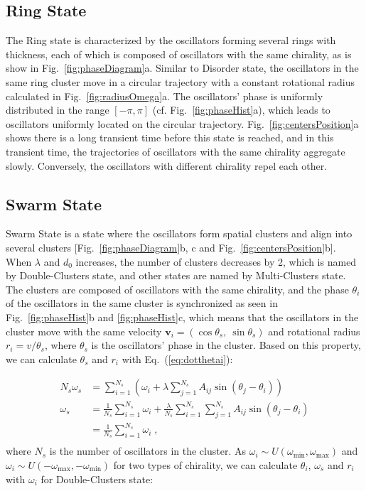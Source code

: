 \documentclass[%
 aip,
 amsmath,amssymb,
 reprint,%
]{revtex4-1}
\begin{document}
\subsection{Ring State}

The Ring state is characterized by the oscillators forming several rings with thickness, each of which is composed of oscillators with the same chirality, as is show in Fig.~\ref{fig:phaseDiagram}a. 
Similar to Disorder state, the oscillators in the same ring cluster move in a circular trajectory with a constant rotational radius calculated in Fig.~\ref{fig:radiusOmega}a. 
The oscillators' phase is uniformly distributed in the range $\left[ -\pi,\pi \right]$ (cf. Fig.~\ref{fig:phaseHist}a), which leads to oscillators uniformly located on the circular trajectory.
Fig.~\ref{fig:centersPosition}a shows there is a long transient time before this state is reached, and in this transient time, the trajectories of oscillators with the same chirality aggregate slowly. Conversely, the oscillators with different chirality repel each other. 


\subsection{Swarm State}

Swarm State is a state where the oscillators form spatial clusters and align into several clusters [Fig.~\ref{fig:phaseDiagram}b, c and Fig.~\ref{fig:centersPosition}b]. When $\lambda$ and $d_0$ increases, the number of clusters decreases by 2, which is named by Double-Clusters state, and other states are named by Multi-Clusters state. The clusters are composed of oscillators with the same chirality, and the phase $\theta_i$ of the oscillators in the same cluster is synchronized as seen in Fig.~\ref{fig:phaseHist}b and \ref{fig:phaseHist}c, which means that the oscillators in the cluster move with the same velocity $\mathbf{v}_i=\left( \cos \theta _s,\ \sin \theta _s \right)$ and rotational radius $r_i=v/\theta_s$, where $\theta_s$ is the oscillators' phase in the cluster. Based on this property, we can calculate $\theta_s$ and $r_i$ with Eq.~(\ref{eq:dotthetai}):

\begin{equation}\label{eq:clusterState}
    \begin{aligned}
        N_s\omega _s&=\sum_{i=1}^{N_s}{\left( \omega _i+\lambda \sum_{j=1}^{N_s}{A_{ij}\sin \left( \theta _j-\theta _i \right)} \right)}\\
        \omega _s&=\frac{1}{N_s}\sum_{i=1}^{N_s}{\omega _i}+\frac{\lambda}{N_s}\sum_{i=1}^{N_s}{\sum_{j=1}^{N_s}{A_{ij}\sin \left( \theta _j-\theta _i \right)}}\\
        &=\frac{1}{N_s}\sum_{i=1}^{N_s}{\omega _i}\;,\\
    \end{aligned}
\end{equation}
where $N_s$ is the number of oscillators in the cluster.
As $\omega_i \sim U\left( \omega _{\min},\omega _{\max} \right)$ and $\omega_i \sim U\left( -\omega _{\max},-\omega _{\min} \right)$ for two types of chirality, we can calculate $\theta_i$, $\omega_s$ and $r_i$ with $\omega_i$ for Double-Clusters state:
\end{document}
